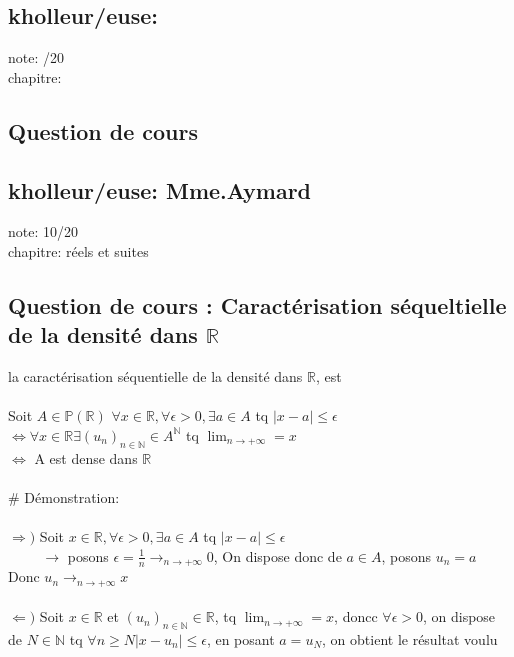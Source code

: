 \documentclass{article}
\begin{document}
\subsection{kholleur/euse: }

note: /20 \\
chapitre: 

\subsection{Question de cours}


\subsection{kholleur/euse: Mme.Aymard}

note: 10/20 \\
chapitre: réels et suites

\subsection{Question de cours : Caractérisation séqueltielle de la densité dans $\mathbb{R}$}

la caractérisation séquentielle de la densité dans $\mathbb{R}$, est \\ \\
Soit $A \in \mathbb{P}(\mathbb{R})$
$\forall x \in \mathbb{R}, \forall \epsilon > 0, \exists a \in A$ tq $|x-a| \leqslant \epsilon$ \\
$\Leftrightarrow \forall x \in \mathbb{R}\exists \left(u_n \right)_{n \in \mathbb{N}} \in A^{\mathbb{N}}$ tq $\lim_{n \rightarrow +\infty} = x$ \\
$\Leftrightarrow$ A est dense dans $\mathbb{R}$ \\ \\

$\#$ Démonstration: \\ \\
$\Rightarrow )$ Soit $x \in \mathbb{R}, \forall \epsilon > 0, \exists a \in A$ tq $|x-a| \leqslant \epsilon$ \\
$\hspace{1cm} \rightarrow$ posons $\epsilon = \frac{1}{n} \rightarrow_{n \rightarrow +\infty} 0$, On dispose donc de $a \in A$, posons $u_n = a$ \\
Donc $u_n \rightarrow_{n \rightarrow +\infty} x$ \\ \\

$\Leftarrow )$ Soit $x \in \mathbb{R}$ et $\left(u_n \right)_{n \in \mathbb{N}} \in \mathbb{R}$, tq $\lim_{n \rightarrow + \infty} = x$, doncc $\forall \epsilon > 0$, on dispose de $N \in \mathbb{N}$ tq $\forall n \geqslant N |x-u_n| \leqslant \epsilon$, en posant $a = u_N$, on obtient le résultat voulu \\ \\
\end{document}
